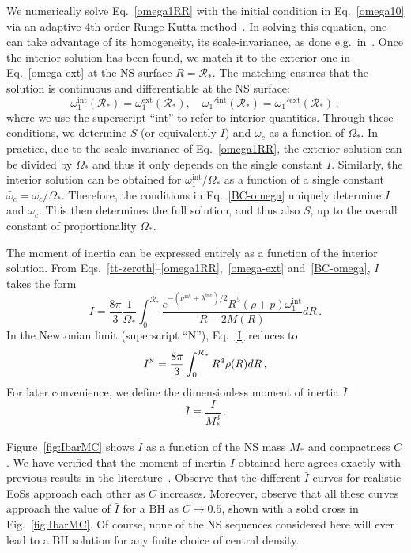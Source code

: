 \documentclass[aps,twocolumn,nofootinbib,showpacs,superscriptaddress,hyperref]{revtex4-1}
\newcommand\be{\begin{equation}}
\newcommand\ee{\end{equation}}
\newcommand{\NS}{*}
\newcommand{\ext}{\mathrm{ext}}
\newcommand{\inter}{\mathrm{int}}
\newcommand{\RNS}{\mathcal{R}_*}
\newcommand{\N}{{\mbox{\tiny N}}}
\begin{document}
We numerically solve Eq.~\eqref{omega1RR} with the initial condition in Eq.~\eqref{omega10} via an adaptive 4th-order Runge-Kutta method~\cite{gsl}. In solving this equation, one can take advantage of its homogeneity, its scale-invariance, as done e.g.~in~\cite{yunespsaltis,kent-CSNS}. Once the interior solution has been found, we match it to the exterior one in Eq.~\eqref{omega-ext} at the NS surface $R=\RNS$. The matching ensures that the solution is continuous and differentiable at the NS surface: 
%
\be
\omega_1^{\inter}(\RNS) = \omega_1^{\ext}(\RNS), \quad  \omega_1'{}^{\inter}(\RNS) = \omega_1'{}^{\ext}(\RNS)\,,
\label{BC-omega}
\ee
% 
where we use the superscript ``int'' to refer to interior quantities. Through these conditions, we determine $S$ (or equivalently $I$)  and $\omega_c$ as a function of $\Omega_{*}$. In practice, due to the scale invariance of Eq.~\eqref{omega1RR}, the exterior solution can be divided by $\Omega_{*}$ and thus it only depends on the single constant $I$. Similarly, the interior solution can be obtained for $\omega_{1}^{\inter}/\Omega_{*}$ as a function of a single constant $\bar{\omega}_{c} = \omega_{c}/\Omega_{*}$. Therefore, the conditions in Eq.~\eqref{BC-omega} uniquely determine $I$ and $\omega_{c}$. This then determines the full solution, and thus also $S$, up to the overall constant of proportionality $\Omega_{*}$. 

The moment of inertia can be expressed entirely as a function of the interior solution. From Eqs.~\eqref{tt-zeroth}--\eqref{omega1RR},~\eqref{omega-ext} and~\eqref{BC-omega}, $I$ takes the form~\cite{hartle1967,kalogera-psaltis}
%
\be
I = \frac{8\pi}{3} \frac{1}{\Omega_\NS} \int_0^{\RNS} \frac{e^{-(\nu^\inter + \lambda^\inter )/2} R^5 (\rho + p) \omega_1^{\inter}}{R-2M(R)} dR\,.
\label{I}
\ee 
%
In the Newtonian limit (superscript ``N''), Eq.~\eqref{I} reduces to~\cite{hartle1967}
%
\be
I^\N = \frac{8\pi}{3} \int^{\RNS}_0 R^4 \rho (R)dR\,,
\label{I-Newton}
\ee
%
For later convenience, we define the dimensionless moment of inertia $\bar{I}$
%
\be
\label{bar-I}
\bar{I} \equiv \frac{I}{M_\NS^3}\,.
\ee
%

Figure~\ref{fig:IbarMC} shows $\bar{I}$ as a function of the NS mass $M_\NS$ and compactness $C$. We have verified that the moment of inertia $I$ obtained here agrees exactly with previous results in the literature~\cite{pani-NS-EDGB}. Observe that the different $\bar{I}$ curves for realistic EoSs approach each other as $C$ increases. Moreover, observe that all these curves approach the value of $\bar{I}$ for a BH as $C \to 0.5$, shown with a solid cross in Fig.~\ref{fig:IbarMC}. Of course, none of the NS sequences considered here will ever lead to a BH solution for any finite choice of central density.
\end{document}
